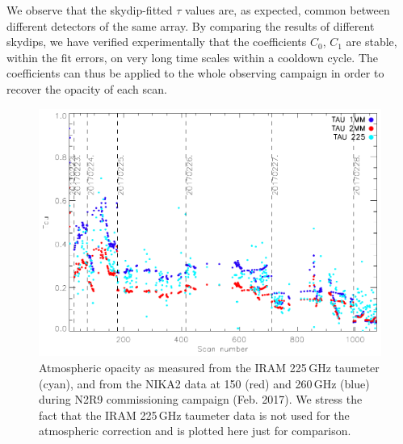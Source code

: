 We observe that the skydip-fitted $\tau$ values are, as expected, common
between different detectors of the same array. By comparing the results of different skydips, we
have verified experimentally that the coefficients $C_0$, $C_1$ are stable,
within the fit errors, on very long time scales within a cooldown cycle. The
coefficients can thus be applied to the whole observing campaign in order to
recover the opacity of each scan.




\begin{figure}[ht]
\begin{center}
\includegraphics[scale=0.8]{../../../Paper_NIKA2_Technical/opacity_evol_run22.pdf}
\caption{Atmospheric opacity as measured from the IRAM 225\,GHz taumeter
(cyan), and from the NIKA2 data at 150 (red) and 260\,GHz (blue) during N2R9
commissioning campaign (Feb. 2017). We stress the fact that the IRAM 225\,GHz
taumeter data is not used for the atmospheric correction and is plotted here
just for comparison.
  \label{fig:taumeas_paper}}
\end{center}
\end{figure}


